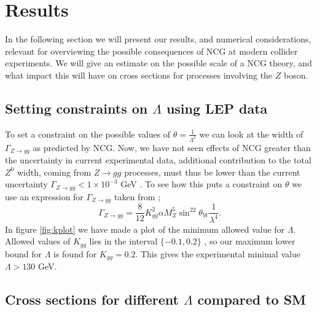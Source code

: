 \section{Results}
In the following section we will present our results, and numerical considerations, relevant for overviewing the possible consequences of NCG at modern collider experiments. We will give an estimate on the possible scale of a NCG theory, and what impact this will have on cross sections for processes involving the $Z$ boson.

\subsection{Setting constraints on $\Lambda$ using LEP data}
To set a constraint on the possible values of $\theta = \frac{1}{\Lambda^2}$ we can look at the width of $\Gamma_{Z \rightarrow gg}$ as predicted by NCG. Now, we have not seen effects of NCG greater than the uncertainty in current experimental data, additional contribution to the total $Z^0$ width, coming from $Z \rightarrow gg$ processes, must thus be lower than the current uncertainty $\Gamma_{Z \rightarrow gg} < 1 \times 10^{-3}$ GeV \cite{behr2003dnc}. To see how this puts a constraint on $\theta$ we use an expression for $\Gamma_{Z \rightarrow gg}$ taken from \cite{behr2003dnc};
\begin{equation} \label{eq:zggwidth}
	\Gamma_{Z \rightarrow gg} = \frac{8}{12} K_{gg}^2 \alpha M_Z^5 \sin^22\theta_W \frac{1}{\lambda^4}.
\end{equation}
In figure \ref{fig:kplot} we have made a plot of the minimum allowed value for $\Lambda$. Allowed values of $K_{gg}$ lies in the interval $\{-0.1,0.2\}$ \cite{behr2003dnc}, so our maximum lower bound for $\Lambda$ is found for $K_{gg}=0.2$. This gives the experimental minimal value $\Lambda >130$ GeV.

\subsection{Cross sections for different $\Lambda$ compared to SM}

